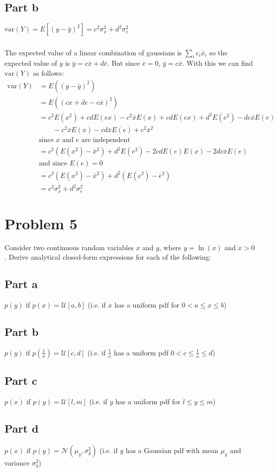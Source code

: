 \documentclass[11pt]{article}
\begin{document}
\subsection*{Part b}
$\text{var}(Y) = E[(y-\bar{y})^2]=c^2\sigma_x^2+d^2\sigma_e^2$

\subparagraph*{}
The expected value of a linear combination of gaussians is $\sum_i c_i\bar{x}_i$ so the expected value of $y$ is $\bar{y}=c\bar{x}+d\bar{e}$. But since $\bar{e}=0$, $\bar{y}=c\bar{x}$. With this we can find $\text{var}(Y)$ as follows:
\begin{align*}
	\text{var}(Y) &= E((y-\bar{y})^2) \\
	&= E((cx+de-c\bar{x})^2) \\
	&= c^2E(x^2)+cdE(ex)-c^2\bar{x}E(x)+cdE(ex)+d^2E(e^2)-dc\bar{x}E(e)\\
	&\qquad -c^2\bar{x}E(x)-cd\bar{x}E(e)+c^2\bar{x}^2 \\
	& \text{since $x$ and $e$ are independent} \\
	&= c^2(E(x^2)-\bar{x}^2)+d^2E(e^2)-2cdE(e)E(x)-2dc\bar{x}E(e)\\
	& \text{and since $E(e)=0$} \\
	&= c^2(E(x^2)-\bar x^2) + d^2(E(e^2) - \bar{e}^2) \\
	&= c^2\sigma_x^2 + d^2\sigma_e^2
\end{align*}

\section*{Problem 5}
Consider two continuous random variables $x$ and $y$, where $y=\ln(x)$ and $x>0$. Derive analytical closed-form expressions for each of the following:

\subsection*{Part a}
$p(y)$ if $p(x) = \mathcal{U}[a,b]$ (i.e. if $x$ has a uniform pdf for $0<a\leq x \leq b$)

\subsection*{Part b}
$p(y)$ if $p(\frac{1}{x})=\mathcal{U}[c,d]$ (i.e. if $\frac{1}{x}$ has a uniform pdf $0<c\leq \frac{1}{x} \leq d$)

\subsection*{Part c}
$p(x)$ if $p(y) = \mathcal{U}[l,m]$ (i.e. if $y$ has a uniform pdf for $l\leq y \leq m$)

\subsection*{Part d}
$p(x)$ if $p(y) = \mathcal{N}(\mu_y,\sigma_y^2)$ (i.e. if $y$ has a Gaussian pdf with mean $\mu_y$ and variance $\sigma_y^2$)
\end{document}
